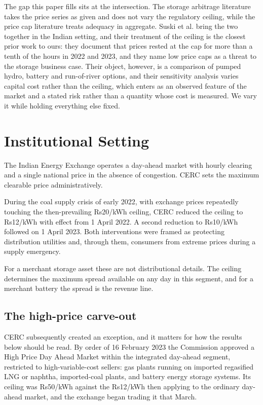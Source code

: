 \documentclass[conference,a4paper]{IEEEtran}
\begin{document}
The gap this paper fills sits at the intersection. The storage arbitrage
literature takes the price series as given and does not vary the regulatory
ceiling, while the price cap literature treats adequacy in aggregate. Suski et
al. \cite{suski2026} bring the two together in the Indian setting, and their
treatment of the ceiling is the closest prior work to ours: they document that
prices rested at the cap for more than a tenth of the hours in 2022 and 2023,
and they name low price caps as a threat to the storage business case. Their
object, however, is a comparison of pumped hydro, battery and run-of-river
options, and their sensitivity analysis varies capital cost rather than the
ceiling, which enters as an observed feature of the market and a stated risk
rather than a quantity whose cost is measured. We vary it while holding
everything else fixed.

\section{Institutional Setting}

The Indian Energy Exchange operates a day-ahead market with hourly clearing and a
single national price in the absence of congestion. CERC sets the maximum
clearable price administratively.

During the coal supply crisis of early 2022, with exchange prices repeatedly
touching the then-prevailing Rs20/kWh ceiling, CERC reduced the ceiling to
Rs12/kWh with effect from 1 April 2022. A second reduction to Rs10/kWh followed
on 1 April 2023. Both interventions were framed as protecting distribution
utilities and, through them, consumers from extreme prices during a supply
emergency.

For a merchant storage asset these are not distributional details. The ceiling
determines the maximum spread available on any day in this segment, and for a
merchant battery the spread is the revenue line.

\subsection{The high-price carve-out}
\label{sec:hpdam}

CERC subsequently created an exception, and it matters for how the results below
should be read. By order of 16 February 2023 the Commission approved a High
Price Day Ahead Market within the integrated day-ahead segment, restricted to
high-variable-cost sellers: gas plants running on imported regasified LNG or
naphtha, imported-coal plants, and battery energy storage systems. Its ceiling
was Rs50/kWh against the Rs12/kWh then applying to the ordinary day-ahead
market, and the exchange began trading it that March.
\end{document}
